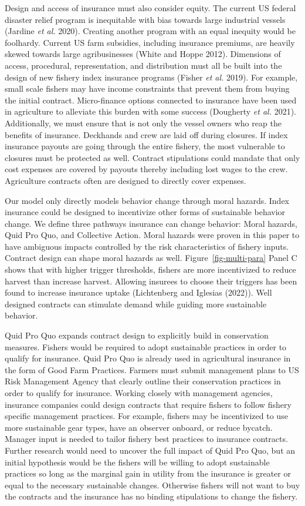 \documentclass[
  letterpaper,
  DIV=11,
  numbers=noendperiod]{scrartcl}
\theoremstyle{plain}
\theoremstyle{plain}
\theoremstyle{remark}
\begin{document}
Design and access of insurance must also consider equity. The current US
federal disaster relief program is inequitable with bias towards large
industrial vessels (Jardine \emph{et al.} 2020). Creating another
program with an equal inequity would be foolhardy. Current US farm
subsidies, including insurance premiums, are heavily skewed towards
large agribusinesses (White and Hoppe 2012). Dimensions of access,
procedural, representation, and distribution must all be built into the
design of new fishery index insurance programs (Fisher \emph{et al.}
2019). For example, small scale fishers may have income constraints that
prevent them from buying the initial contract. Micro-finance options
connected to insurance have been used in agriculture to alleviate this
burden with some success (Dougherty \emph{et al.} 2021). Additionally,
we must ensure that is not only the vessel owners who reap the benefits
of insurance. Deckhands and crew are laid off during closures. If index
insurance payouts are going through the entire fishery, the most
vulnerable to closures must be protected as well. Contract stipulations
could mandate that only cost expenses are covered by payouts thereby
including lost wages to the crew. Agriculture contracts often are
designed to directly cover expenses.

Our model only directly models behavior change through moral hazards.
Index insurance could be designed to incentivize other forms of
sustainable behavior change. We define three pathways insurance can
change behavior: Moral hazards, Quid Pro Quo, and Collective Action.
Moral hazards were proven in this paper to have ambiguous impacts
controlled by the risk characteristics of fishery inputs. Contract
design can shape moral hazards as well. Figure~\ref{fig-multi-para}
Panel C shows that with higher trigger thresholds, fishers are more
incentivized to reduce harvest than increase harvest. Allowing insurees
to choose their triggers has been found to increase insurance uptake
(Lichtenberg and Iglesias (2022)). Well designed contracts can stimulate
demand while guiding more sustainable behavior.

Quid Pro Quo expands contract design to explicitly build in conservation
measures. Fishers would be required to adopt sustainable practices in
order to qualify for insurance. Quid Pro Quo is already used in
agricultural insurance in the form of Good Farm Practices. Farmers must
submit management plans to US Risk Management Agency that clearly
outline their conservation practices in order to qualify for insurance.
Working closely with management agencies, insurance companies could
design contracts that require fishers to follow fishery specific
management practices. For example, fishers may be incentivized to use
more sustainable gear types, have an observer onboard, or reduce
bycatch. Manager input is needed to tailor fishery best practices to
insurance contracts. Further research would need to uncover the full
impact of Quid Pro Quo, but an initial hypothesis would be the fishers
will be willing to adopt sustainable practices so long as the marginal
gain in utility from the insurance is greater or equal to the necessary
sustainable changes. Otherwise fishers will not want to buy the
contracts and the insurance has no binding stipulations to change the
fishery.
\end{document}

